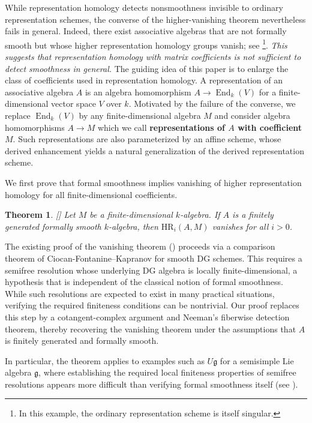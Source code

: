 \documentclass{article}
\numberwithin{equation}{section} %
\theoremstyle{plain}
\newtheorem*{thm}{Theorem}
\theoremstyle{definition}
\theoremstyle{remark}
\begin{document}
While representation homology detects nonsmoothness invisible to ordinary representation schemes, the converse of the higher-vanishing theorem nevertheless fails in general.
Indeed, there exist associative algebras that are not formally smooth but whose higher representation homology groups vanish; see \cite[Section 6.2.2]{BFR14}\footnote{In this example, the ordinary representation scheme is itself singular.}.
\emph{This suggests that representation homology with matrix coefficients is not sufficient to detect smoothness in general.}
The guiding idea of this paper is to enlarge the class of coefficients used in representation homology.
A representation of an associative algebra $A$ is an algebra homomorphism $A\to\operatorname{End}_k(V)$ for a finite-dimensional vector space $V$ over $k$.
Motivated by the failure of the converse, we replace $\operatorname{End}_k(V)$ by any finite-dimensional algebra $M$ and consider algebra homomorphisms $A\to M$ which we call \textbf{representations of $A$ with coefficient $M$}.
Such representations are also parameterized by an affine scheme, whose derived enhancement yields a natural generalization of the derived representation scheme.

We first prove that formal smoothness implies vanishing of higher representation homology for all finite-dimensional coefficients.

\begin{thm}\label{Thm}[]
Let $M$ be a finite-dimensional $k$-algebra. If $A$ is a finitely generated formally smooth $k$-algebra, then $\mathrm{HR}_i(A,M)$ vanishes for all $i>0$.
\end{thm}

The existing proof of the vanishing theorem (\cite[Theorem 21]{BFR14}) proceeds via a comparison theorem of Ciocan-Fontanine--Kapranov for smooth DG schemes.
This requires a semifree resolution whose underlying DG algebra is locally finite-dimensional, a hypothesis that is independent of the classical notion of formal smoothness.
While such resolutions are expected to exist in many practical situations, verifying the required finiteness conditions can be nontrivial.
Our proof replaces this step by a cotangent-complex argument and Neeman's fiberwise detection theorem, thereby recovering the vanishing theorem under the assumptions that $A$ is finitely generated and formally smooth.

In particular, the theorem applies to examples such as $U\mathfrak{g}$ for a semisimple Lie algebra $\mathfrak{g}$, where establishing the required local finiteness properties of semifree resolutions appears more difficult than verifying formal smoothness itself (see ).
\end{document}
